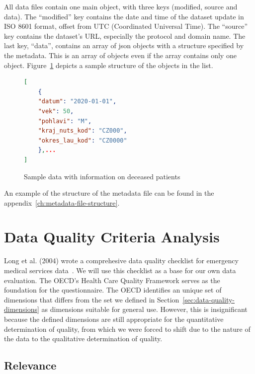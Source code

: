 All data files contain one main object, with three keys (modified, source and data).
The \enquote{modified} key contains the date and time of the dataset update in ISO 8601 format, offset from UTC (Coordinated Universal Time).
The \enquote{source} key contains the dataset's URL, especially the protocol and domain name.
The last key, \enquote{data}, contains an array of json objects with a structure specified by the metadata.
This is an array of objects even if the array contains only one object.
Figure~\ref{ls:sample-data-deceased} depicts a sample structure of the objects in the list.

\begin{figure}[htb]
    \centering

    \begin{lstlisting}[language=json,firstnumber=1]
[
    {
    "datum": "2020-01-01",
    "vek": 50,
    "pohlavi": "M",
    "kraj_nuts_kod": "CZ000",
    "okres_lau_kod": "CZ0000"
    },...
]
    \end{lstlisting}

    \caption{Sample data with information on deceased patients}
    \label{ls:sample-data-deceased}
\end{figure}
\FloatBarrier

An example of the structure of the metadata file can be found in the appendix~\ref{ch:metadata-file-structure}.

\section{Data Quality Criteria Analysis}

Long et al. (2004) wrote a comprehesive data quality checklist for emergency medical services data~\cite{long2004}.
We will use this checklist as a base for our own data evaluation.
The OECD's Health Care Quality Framework serves as the foundation for the questionnaire.
The OECD identifies an unique set of dimensions that differs from the set we defined in Section~\ref{sec:data-quality-dimensions} as dimensions suitable for general use.
However, this is insignificant because the defined dimensions are still appropriate for the quantitative determination of quality, from which we were forced to shift due to the nature of the data to the qualitative determination of quality.

\subsection{Relevance}

